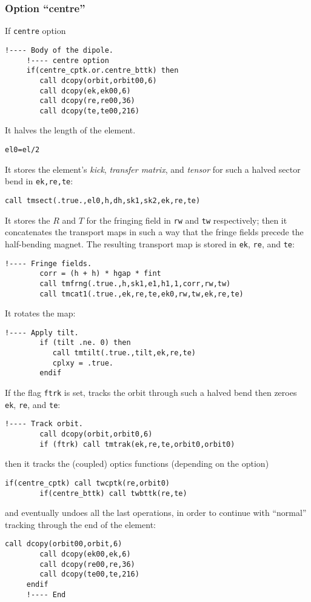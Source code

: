 \documentclass{cern-art} %
\renewcommand{\L}[1]{\lstinline[firstnumber=last]{#1}}
\begin{document}
\subsubsection{Option ``centre''}
If \L{centre} option
   \begin{lstlisting}[firstnumber=last]
     !---- Body of the dipole.
     !---- centre option
     if(centre_cptk.or.centre_bttk) then
        call dcopy(orbit,orbit00,6)
        call dcopy(ek,ek00,6)
        call dcopy(re,re00,36)
        call dcopy(te,te00,216)
  \end{lstlisting}
It halves the length of the element.
   \begin{lstlisting}[firstnumber=last]
        el0=el/2
\end{lstlisting}
It stores the element's \textit{kick}, \textit{transfer matrix}, and \textit{tensor} for such a halved sector bend in \L{ek,re,te}:
\begin{lstlisting}[firstnumber=last]
        call tmsect(.true.,el0,h,dh,sk1,sk2,ek,re,te)
\end{lstlisting}
It stores the $R$ and $T$ for the fringing field in \L{rw} and \L{tw} respectively; then it concatenates the transport maps in such a way that the fringe fields precede the half-bending magnet. The resulting transport map is stored in   \L{ek},  \L{re}, and \L{te}:
\begin{lstlisting}[firstnumber=last]
        !---- Fringe fields.
        corr = (h + h) * hgap * fint
        call tmfrng(.true.,h,sk1,e1,h1,1,corr,rw,tw)
        call tmcat1(.true.,ek,re,te,ek0,rw,tw,ek,re,te)
\end{lstlisting}
It rotates the map:
\begin{lstlisting}[firstnumber=last]
        !---- Apply tilt.
        if (tilt .ne. 0) then
           call tmtilt(.true.,tilt,ek,re,te)
           cplxy = .true.
        endif
\end{lstlisting}
If the flag \L{ftrk} is set, tracks the orbit through such a halved bend then zeroes \L{ek},  \L{re}, and \L{te}:
\begin{lstlisting}[firstnumber=last]
        !---- Track orbit.
        call dcopy(orbit,orbit0,6)
        if (ftrk) call tmtrak(ek,re,te,orbit0,orbit0)
\end{lstlisting}
then it tracks the (coupled) optics functions (depending on the option)
\begin{lstlisting}[firstnumber=last]
        if(centre_cptk) call twcptk(re,orbit0)
        if(centre_bttk) call twbttk(re,te)
\end{lstlisting}
and eventually undoes all the last operations, in order to continue with ``normal'' tracking through the end of the element:
\begin{lstlisting}[firstnumber=last]
        call dcopy(orbit00,orbit,6)
        call dcopy(ek00,ek,6)
        call dcopy(re00,re,36)
        call dcopy(te00,te,216)
     endif
     !---- End
  \end{lstlisting}
\end{document}
